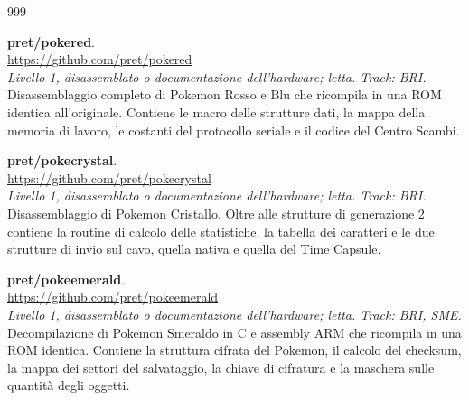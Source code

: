 %

\begin{thebibliography}{999}
\raggedright
\setlength{\labelsep}{0.5em}
\setlength{\itemsep}{0.8ex}

  \textbf{pret/pokered}.
  \\ \url{https://github.com/pret/pokered}
  \\ \emph{Livello 1, disassemblato o documentazione dell'hardware; letta. Track: BRI.}
  \\ Disassemblaggio completo di Pokemon Rosso e Blu che ricompila in una ROM identica all'originale. Contiene le macro delle strutture dati, la mappa della memoria di lavoro, le costanti del protocollo seriale e il codice del Centro Scambi.

  \textbf{pret/pokecrystal}.
  \\ \url{https://github.com/pret/pokecrystal}
  \\ \emph{Livello 1, disassemblato o documentazione dell'hardware; letta. Track: BRI.}
  \\ Disassemblaggio di Pokemon Cristallo. Oltre alle strutture di generazione 2 contiene la routine di calcolo delle statistiche, la tabella dei caratteri e le due strutture di invio sul cavo, quella nativa e quella del Time Capsule.

  \textbf{pret/pokeemerald}.
  \\ \url{https://github.com/pret/pokeemerald}
  \\ \emph{Livello 1, disassemblato o documentazione dell'hardware; letta. Track: BRI, SME.}
  \\ Decompilazione di Pokemon Smeraldo in C e assembly ARM che ricompila in una ROM identica. Contiene la struttura cifrata del Pokemon, il calcolo del checksum, la mappa dei settori del salvataggio, la chiave di cifratura e la maschera sulle quantità degli oggetti.


\end{thebibliography}
